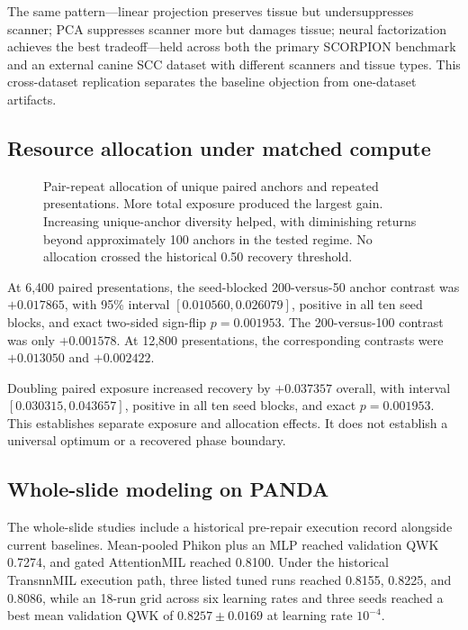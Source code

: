 \documentclass[10pt]{article}
\begin{document}
The same pattern---linear projection preserves tissue but undersuppresses scanner; PCA suppresses scanner more but damages tissue; neural factorization achieves the best tradeoff---held across both the primary SCORPION benchmark and an external canine SCC dataset with different scanners and tissue types. This cross-dataset replication separates the baseline objection from one-dataset artifacts.

\subsection{Resource allocation under matched compute}
\begin{figure}[t]
\centering
\resizebox{0.78\textwidth}{!}{}
\caption{Pair-repeat allocation of unique paired anchors and repeated presentations. More total exposure produced the largest gain. Increasing unique-anchor diversity helped, with diminishing returns beyond approximately 100 anchors in the tested regime. No allocation crossed the historical 0.50 recovery threshold.}
\label{fig:resource_allocation}
\end{figure}

At 6,400 paired presentations, the seed-blocked 200-versus-50 anchor contrast was $+0.017865$, with 95\% interval $[0.010560,0.026079]$, positive in all ten seed blocks, and exact two-sided sign-flip $p=0.001953$. The 200-versus-100 contrast was only $+0.001578$. At 12,800 presentations, the corresponding contrasts were $+0.013050$ and $+0.002422$.

Doubling paired exposure increased recovery by $+0.037357$ overall, with interval $[0.030315,0.043657]$, positive in all ten seed blocks, and exact $p=0.001953$. This establishes separate exposure and allocation effects. It does not establish a universal optimum or a recovered phase boundary.

\subsection{Whole-slide modeling on PANDA}
The whole-slide studies include a historical pre-repair execution record alongside current baselines. Mean-pooled Phikon plus an MLP reached validation QWK 0.7274, and gated AttentionMIL reached 0.8100. Under the historical TransnnMIL execution path, three listed tuned runs reached 0.8155, 0.8225, and 0.8086, while an 18-run grid across six learning rates and three seeds reached a best mean validation QWK of $0.8257\pm0.0169$ at learning rate $10^{-4}$.
\end{document}
